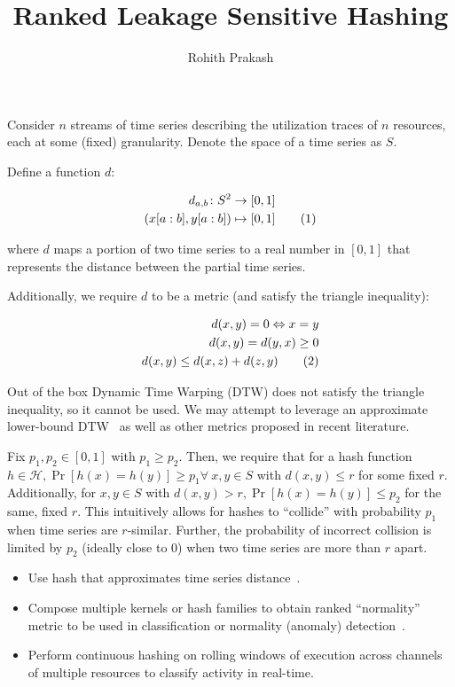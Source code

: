 \documentclass{article}
\title{Ranked Leakage Sensitive Hashing}
\author{Rohith Prakash}
\date{}
\newcommand\numberthis{\addtocounter{equation}{1}\tag{\theequation}}
\begin{document}
\maketitle{}

Consider $n$ streams of time series describing the utilization traces of $n$ resources, each at some (fixed) granularity.
Denote the space of a time series as $S$.

Define a function $d$:

\begin{align*}
    d_{a,b} \colon S^2 &\to [0,1]\\
    (x[a:b],y[a:b]) &\mapsto [0,1] \numberthis
\end{align*}

where $d$ maps a portion of two time series to a real number in $[0,1]$ that represents the distance between the partial time series.

Additionally, we require $d$ to be a metric (and satisfy the triangle inequality):

\begin{align*}
    d(x,y) = 0 \Leftrightarrow x = y \\
    d(x,y) = d(y,x) \ge 0 \\
    d(x,y) \le d(x,z) + d(z,y) \numberthis
\end{align*}

Out of the box Dynamic Time Warping (DTW) does not satisfy the triangle inequality, so it cannot be used.
We may attempt to leverage an approximate lower-bound DTW~\cite{Lemire09-DTW} as well as other metrics proposed in recent literature.

Fix $p_1, p_2 \in [0,1]$ with $p_1 \ge p_2$.
Then, we require that for a hash function $h \in \mathcal{H}, \Pr[h(x) = h(y)] \ge p_1 \forall~x,y \in S$ with $d(x,y) \le r$ for some fixed $r$.
Additionally, for $x,y \in S$ with $d(x,y) > r, \Pr[h(x) = h(y)] \le p_2$ for the same, fixed $r$.
This intuitively allows for hashes to ``collide'' with probability $p_1$ when time series are $r$-similar.
Further, the probability of incorrect collision is limited by $p_2$ (ideally close to $0$) when two time series are more than $r$ apart.

\begin{itemize}
    \item Use hash that approximates time series distance~\cite{Hachiya13-NSH,Kale14-KLSH}.
    \item Compose multiple kernels or hash families to obtain ranked ``normality'' metric to be used in classification or normality (anomaly) detection~\cite{Kim16-SLSH}.
    \item Perform continuous hashing on rolling windows of execution across channels of multiple resources to classify activity in real-time.
\end{itemize}



\end{document}
